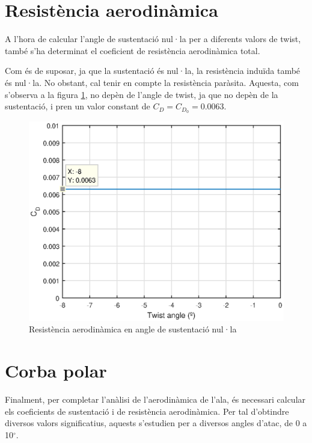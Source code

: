 \section{Resistència aerodinàmica}
A l'hora de calcular l'angle de sustentació nul·la per a diferents valors de twist, també s'ha determinat el coeficient de resistència aerodinàmica total.

Com és de suposar, ja que la sustentació és nul·la, la resistència induïda també és nul·la. No obstant, cal tenir en compte la resistència paràsita. Aquesta, com s'observa a la figura \ref{cdpar}, no depèn de l'angle de twist, ja que no depèn de la sustentació, i pren un valor constant de $C_{D}=C_{D_{0}}=0.0063$.

\begin{figure}[h]
	\centering
	\includegraphics{./plots/cdparasita}
	\caption{Resistència aerodinàmica en angle de sustentació nul·la}
	\label{cdpar}
\end{figure}

\section{Corba polar}
Finalment, per completar l'anàlisi de l'aerodinàmica de l'ala, és necessari calcular els coeficients de sustentació i de resistència aerodinàmica. Per tal d'obtindre diversos valors significatius, aquests s'estudien per a diversos angles d'atac, de 0 a 10$^{\circ}$.

